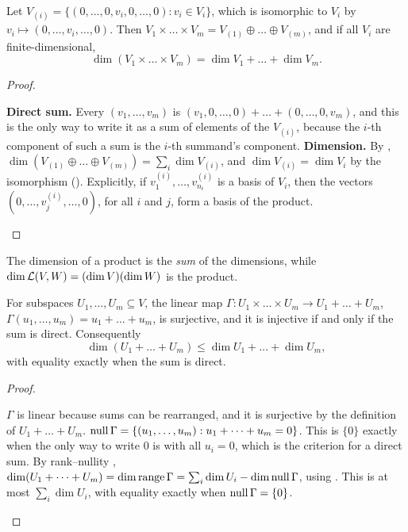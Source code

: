 \documentclass[10pt]{scrartcl}
\begin{document}
\begin{proposition*}
  Let $V_{(i)}=\{(0,\dots,0,v_i,0,\dots,0):v_i\in V_i\}$, which is isomorphic to $V_i$ by $v_i\mapsto(0,\dots,v_i,\dots,0)$. Then $V_1\times\dots\times V_m=V_{(1)}\oplus\dots\oplus V_{(m)}$, and if all $V_i$ are finite-dimensional,
  \[
    \dim(V_1\times\dots\times V_m) = \dim V_1 + \dots + \dim V_m.
  \]
\end{proposition*}
\begin{proof}
  \begin{steps}
    \ii \textbf{Direct sum.} Every $(v_1,\dots,v_m)$ is $(v_1,0,\dots,0)+\dots+(0,\dots,0,v_m)$, and this is the only way to write it as a sum of elements of the $V_{(i)}$, because the $i$-th component of such a sum is the $i$-th summand's component.
    \ii \textbf{Dimension.} By , $\dim(V_{(1)}\oplus\dots\oplus V_{(m)})=\sum_i\dim V_{(i)}$, and $\dim V_{(i)}=\dim V_i$ by the isomorphism (). Explicitly, if $v^{(i)}_1,\dots,v^{(i)}_{n_i}$ is a basis of $V_i$, then the vectors $(0,\dots,v^{(i)}_j,\dots,0)$, for all $i$ and $j$, form a basis of the product.
  \end{steps}
\end{proof}

The dimension of a product is the \emph{sum} of the dimensions, while $\dim\mathcal L(V,W)=(\dim V)(\dim W)$ is the product.

\begin{proposition*}
  For subspaces $U_1,\dots,U_m\subseteq V$, the linear map $\Gamma\colon U_1\times\dots\times U_m\to U_1+\dots+U_m$, $\Gamma(u_1,\dots,u_m)=u_1+\dots+u_m$, is surjective, and it is injective if and only if the sum is direct. Consequently
  \[
    \dim(U_1+\dots+U_m)\le\dim U_1+\dots+\dim U_m,
  \]
  with equality exactly when the sum is direct.
\end{proposition*}
\begin{proof}
  \begin{steps}
    \ii $\Gamma$ is linear because sums can be rearranged, and it is surjective by the definition of $U_1+\dots+U_m$.
    \ii $\operatorname{null}\Gamma=\{(u_1,\dots,u_m):u_1+\dots+u_m=0\}$. This is $\{0\}$ exactly when the only way to write $0$ is with all $u_i=0$, which is the criterion  for a direct sum.
    \ii By rank--nullity , $\dim(U_1+\dots+U_m)=\dim\operatorname{range}\Gamma=\sum_i\dim U_i-\dim\operatorname{null}\Gamma$, using . This is at most $\sum_i\dim U_i$, with equality exactly when $\operatorname{null}\Gamma=\{0\}$.
  \end{steps}
\end{proof}
\end{document}
